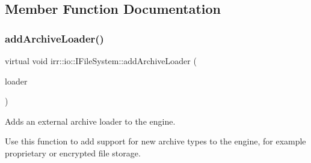 \subsection{Member Function Documentation}
\mbox{\label{classirr_1_1io_1_1IFileSystem_ad56456302b4697c49b461a909d9269b9}} 
\subsubsection{\texorpdfstring{add\+Archive\+Loader()}{addArchiveLoader()}}
{\footnotesize\ttfamily virtual void irr\+::io\+::\+I\+File\+System\+::add\+Archive\+Loader (\begin{DoxyParamCaption}\item[{\hyperlink{classirr_1_1io_1_1IArchiveLoader}{I\+Archive\+Loader} $\ast$}]{loader }\end{DoxyParamCaption})\hspace{0.3cm}{\ttfamily [pure virtual]}}



Adds an external archive loader to the engine. 

Use this function to add support for new archive types to the engine, for example proprietary or encrypted file storage. \mbox{\label{classirr_1_1io_1_1IFileSystem_afe6641c7f88a8fea0205c113b8379730}} 
